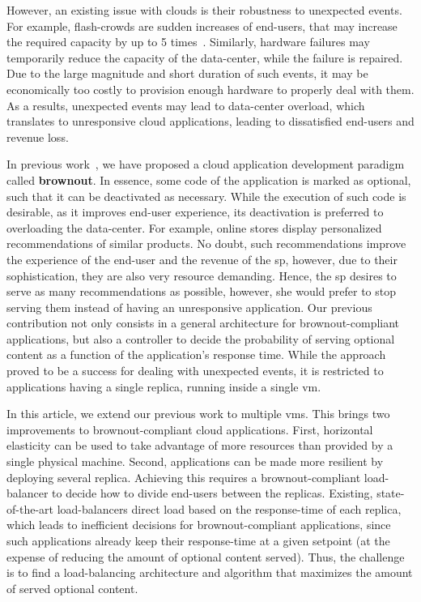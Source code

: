 However, an existing issue with clouds is their robustness to unexpected events. For example, flash-crowds are sudden increases of end-users, that may increase the required capacity by up to 5 times~\cite{PeaksPaperThatMinaPresented}. Similarly, hardware failures may temporarily reduce the capacity of the data-center, while the failure is repaired. Due to the large magnitude and short duration of such events, it may be economically too costly to provision enough hardware to properly deal with them. As a results, unexpected events may lead to data-center overload, which translates to unresponsive cloud applications, leading to dissatisfied end-users and revenue loss.

In previous work~\cite{us}, we have proposed a cloud application development paradigm called {\bf brownout}. In essence, some code of the application is marked as optional, such that it can be deactivated as necessary. While the execution of such code is desirable, as it improves end-user experience, its deactivation is preferred to overloading the data-center. For example, online stores display personalized recommendations of similar products. No doubt, such recommendations improve the experience of the end-user and the revenue of the \ac{sp}, however, due to their sophistication, they are also very resource demanding. Hence, the \ac{sp} desires to serve as many recommendations as possible, however, she would prefer to stop serving them instead of having an unresponsive application. Our previous contribution not only consists in a general architecture for brownout-compliant applications, but also a controller to decide the probability of serving optional content as a function of the application's response time. While the approach proved to be a success for dealing with unexpected events, it is restricted to applications having a single replica, running inside a single \ac{vm}.

In this article, we extend our previous work to multiple \acp{vm}. This brings two improvements to brownout-compliant cloud applications. First, horizontal elasticity can be used to take advantage of more resources than provided by a single physical machine. Second, applications can be made more resilient by deploying several replica. Achieving this requires a brownout-compliant load-balancer to decide how to divide end-users between the replicas. Existing, state-of-the-art load-balancers direct load based on the response-time of each replica, which leads to inefficient decisions for brownout-compliant applications, since such applications already keep their response-time at a given setpoint (at the expense of reducing the amount of optional content served). Thus, the challenge is to find a load-balancing architecture and algorithm that maximizes the amount of served optional content.


